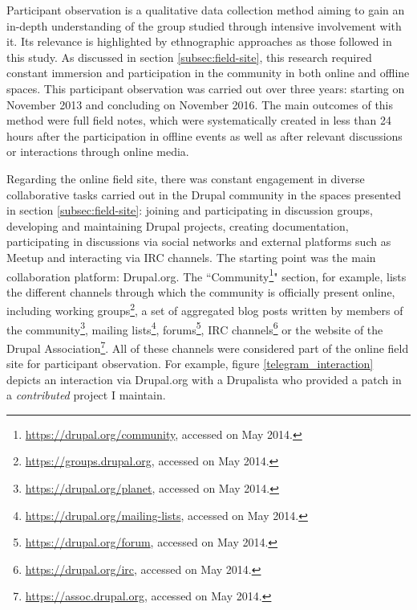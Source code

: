 Participant observation is a qualitative data collection method aiming to gain an in-depth understanding of the group studied through intensive involvement with it. Its relevance is highlighted by ethnographic approaches as those followed in this study. As discussed in section \ref{subsec:field-site}, this research required constant immersion and participation in the community in both online and offline spaces. This participant observation was carried out over three years: starting on  November 2013 and concluding on  November 2016. The main outcomes of this method were full field notes, which were systematically created in less than 24 hours after the participation in offline events as well as after relevant discussions or interactions through online media.

Regarding the online field site, there was constant engagement in diverse collaborative tasks carried out in the Drupal community in the spaces presented in section \ref{subsec:field-site}: joining and participating in discussion groups, developing and maintaining Drupal projects, creating documentation, participating in discussions via social networks and external platforms such as Meetup and interacting via IRC channels. The starting point was the main collaboration platform: Drupal.org. The ``Community\footnote{\url{https://drupal.org/community}, accessed on  May 2014.}" section, for example, lists the different channels through which the community is officially present online, including working groups\footnote{\url{https://groups.drupal.org}, accessed on  May 2014.}, a set of aggregated blog posts written by members of the community\footnote{\url{https://drupal.org/planet}, accessed on  May 2014.}, mailing lists\footnote{\url{https://drupal.org/mailing-lists}, accessed on  May 2014.}, forums\footnote{\url{https://drupal.org/forum}, accessed on  May 2014.}, IRC channels\footnote{\url{https://drupal.org/irc}, accessed on  May 2014.} or the website of the Drupal Association\footnote{\url{https://assoc.drupal.org}, accessed on  May 2014.}.  All of these channels were considered part of the online field site for participant observation. For example, figure \ref{telegram_interaction} depicts an interaction via Drupal.org with a Drupalista who provided a patch in a \textit{contributed} project I maintain.

